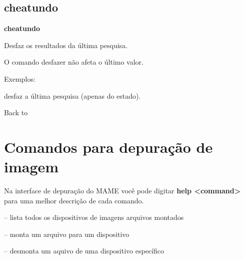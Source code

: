 \documentclass[letterpaper,10pt,brazil]{sphinxmanual}
\begin{document}
\subsection{cheatundo}
\label{debugger/cheats:cheatundo}\label{debugger/cheats:debugger-command-cheatundo}
\begin{DUlineblock}{0em}
\item[]
\begin{DUlineblock}{\DUlineblockindent}
\item[] \textbf{cheatundo}
\item[] 
\end{DUlineblock}
\item[] Desfaz os resultados da última pesquisa.
\item[] 
\item[] O comando desfazer não afeta o último valor.
\item[] 
\item[] 
\item[] Exemplos:
\item[] 
\item[]
\begin{DUlineblock}{\DUlineblockindent}
\item[] 
\item[] 
\end{DUlineblock}
\item[] desfaz a última pesquisa (apenas do estado).
\item[] 
\item[] Back to {\hyperref[debugger/cheats:debugger\string-cheats\string-list]{}}
\end{DUlineblock}


\section{Comandos para depuração de imagem}
\label{debugger/image:debugger-image-list}\label{debugger/image::doc}\label{debugger/image:comandos-para-depuracao-de-imagem}
Na interface de depuração do MAME você pode digitar \textbf{help \textless{}command\textgreater{}}
para uma melhor descrição de cada comando.

\begin{DUlineblock}{0em}
\item[] {\hyperref[debugger/image:debugger\string-command\string-images]{}} -- lista todos os dispositivos de imagens arquivos montados
\item[] {\hyperref[debugger/image:debugger\string-command\string-mount]{}} -- monta um arquivo para um dispositivo
\item[] {\hyperref[debugger/image:debugger\string-command\string-unmount]{}} -- desmonta um aquivo de uma dispositivo específico
\end{DUlineblock}
\begin{quote}
\label{debugger/image:debugger-command-images}\end{quote}
\end{document}
